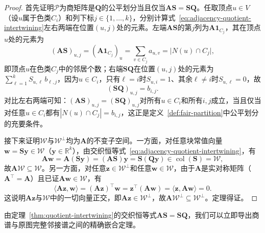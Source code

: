 \begin{proof}
首先证明$\mathcal P$为商矩阵是$\bm Q$的公平划分当且仅当$\bm A\bm S=\bm S\bm Q$。任取顶点$u\in V$（设$u$属于色类$C_i$）和列下标$j\in\{1,\ldots,k\}$，分别计算式~\eqref{eq:adjacency-quotient-intertwining}左右两端在位置$(u,j)$处的元素。左端$\bm A\bm S$的第$j$列为$\bm A\bm 1_{C_j}$，其在顶点$u$处的元素为
\[
(\bm A\bm S)_{u,j}=(\bm A\bm 1_{C_j})_u=\sum_{v\in C_j}a_{u,v}=\bigl|N(u)\cap C_j\bigr|,
\]
即顶点$u$在色类$C_j$中的邻居个数；右端$\bm S\bm Q$在位置$(u,j)$处的元素为$\sum_{\ell=1}^k S_{u,\ell}\,b_{\ell,j}$，因为$u\in C_i$，只有$\ell=i$时$S_{u,i}=1$、其余$\ell\neq i$时$S_{u,\ell}=0$，故
\[
(\bm S\bm Q)_{u,j}=b_{i,j}.
\]
对比左右两端可知：$(\bm A\bm S)_{u,j}=(\bm S\bm Q)_{u,j}$对所有$u\in C_i$和所有$i,j$成立，当且仅当对任意$u\in C_i$都有$|N(u)\cap C_j|=b_{i,j}$，这正是定义~\ref{def:fair-partition}中公平划分的充要条件。

接下来证明$\mathcal W$与$\mathcal W^\perp$均为$\bm A$的不变子空间。一方面，对任意块常值向量$\bm w=\bm S\bm y\in\mathcal W$（$\bm y\in\mathbb R^k$），由交织恒等式~\eqref{eq:adjacency-quotient-intertwining}，有
\[
\bm A\bm w=\bm A(\bm S\bm y)=(\bm A\bm S)\bm y=\bm S(\bm Q\bm y)\in\operatorname{col}(\bm S)=\mathcal W,
\]
故$\bm A\mathcal W\subseteq\mathcal W$。另一方面，对任意$\bm z\in\mathcal W^\perp$和任意$\bm w\in\mathcal W$，由于$\bm A$是实对称矩阵（$\bm A^\top=\bm A$）且已证$\bm A\bm w\in\mathcal W$，有
\[
\langle\bm A\bm z,\bm w\rangle
=(\bm A\bm z)^\top\bm w
=\bm z^\top(\bm A\bm w)
=\langle\bm z,\bm A\bm w\rangle=0.
\]
这说明$\bm A\bm z$与$\mathcal W$中的一切向量正交，即$\bm A\bm z\in\mathcal W^\perp$，故$\bm A\mathcal W^\perp\subseteq\mathcal W^\perp$。定理得证。
\end{proof}

由定理~\ref{thm:quotient-intertwining}的交织恒等式$\bm A\bm S=\bm S\bm Q$，我们可以立即导出商谱与原图完整邻接谱之间的精确嵌合定理。


